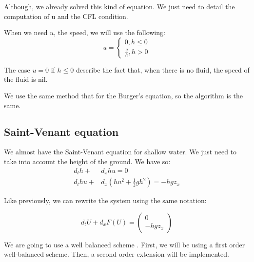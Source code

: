         Although, we already solved this kind of equation. We just need to detail the computation of u and the CFL condition.
        \begin{remark}
            When we need $u$, the speed, we will use the following:
            \begin{equation*}
                u = 
                \begin{cases}
                    0, h\leq 0\\
                    \frac{q}{h}, h>0
                \end{cases}
            \end{equation*}
        \end{remark}
        The case $ u=0$ if $h\leq 0$ describe the fact that, when there is no fluid, the speed of the fluid is nil.
        
        
        
        We use the same method that for the Burger's equation, so the algorithm is the same.
    
    \newpage
    \subsection{Saint-Venant equation}
        
        We almost have the Saint-Venant equation for shallow water. We just need to take into account the height of the ground. We have so:
        \begin{align*}
            d_t h + &d_x hu =0\\
            d_t hu + &d_x (hu^2 + \frac{1}{2}gh^2) = -hgz_x
        \end{align*}
        
        Like previously, we can rewrite the system using the same notation:
        
        \begin{equation*}
            d_t U+d_x F(U) = \begin{pmatrix}0\\ -hgz_x\end{pmatrix}
        \end{equation*}
        
        We are going to use a well balanced scheme . First, we will be using a first order well-balanced scheme. Then, a second order extension will be implemented.
        
